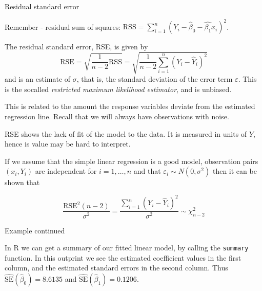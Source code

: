 \documentclass[ignorenonframetext,]{beamer}
\begin{document}
\begin{frame}

\begin{block}{Residual standard error}

Remember - residual sum of squares:
\(\text{RSS}=\sum_{i=1}^n (Y_i-\hat{\beta}_0-\hat{\beta_1}x_{i})^2\).

The residual standard error, RSE, is given by
\[\text{RSE}  =\sqrt{\frac{1}{n-2} \text{RSS}} = \sqrt{\frac{1}{n-2}\sum_{i=1}^n (Y_i -\hat{Y}_i)^2}\]
and is an estimate of \(\sigma\), that is, the standard deviation of the
error term \(\varepsilon\). This is the socalled \emph{restricted
maximum likelihood estimator}, and is unbiased.

This is related to the amount the response variables deviate from the
estimated regression line. Recall that we will always have observations
with noise.

RSE shows the lack of fit of the model to the data. It is measured in
units of \(Y\), hence is value may be hard to interpret.

\end{block}

\end{frame}

\begin{frame}[fragile]

If we assume that the simple linear regression is a good model,
observation pairs \((x_i,Y_i)\) are independent for \(i=1,\ldots,n\) and
that \(\varepsilon_i\sim N(0,\sigma^2)\) then it can be shown that

\[\frac{\text{RSE}^2(n-2)}{\sigma^2}= \frac{\sum_{i=1}^n (Y_i -\hat{Y}_i)^2}{\sigma^2}\sim \chi^2_{n-2}\]

\begin{block}{Example continued}

In R we can get a summary of our fitted linear model, by calling the
\texttt{summary} function. In this outprint we see the estimated
coefficient values in the first column, and the estimated standard
errors in the second column. Thus
\(\hat{\text{SE}}(\hat{\beta}_0) = 8.6135\) and
\(\hat{\text{SE}}(\hat{\beta}_1) = 0.1206\).

\end{block}

\end{frame}
\end{document}
